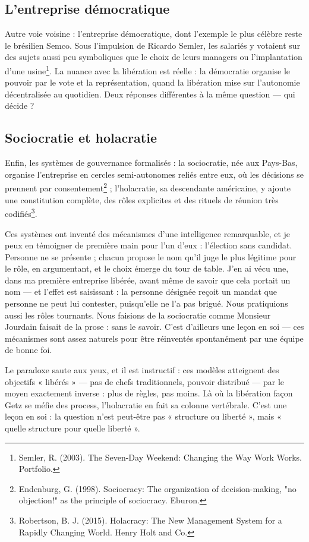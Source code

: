 \subsection{L'entreprise démocratique}

Autre voie voisine : l'entreprise démocratique, dont l'exemple le plus célèbre reste le brésilien Semco. Sous l'impulsion de Ricardo Semler, les salariés y votaient sur des sujets aussi peu symboliques que le choix de leurs managers ou l'implantation d'une usine\footnote{Semler, R. (2003). The Seven-Day Weekend: Changing the Way Work Works. Portfolio.}. La nuance avec la libération est réelle : la démocratie organise le pouvoir par le vote et la représentation, quand la libération mise sur l'autonomie décentralisée au quotidien. Deux réponses différentes à la même question — qui décide ?

\subsection{Sociocratie et holacratie}

Enfin, les systèmes de gouvernance formalisés : la sociocratie, née aux Pays-Bas, organise l'entreprise en cercles semi-autonomes reliés entre eux, où les décisions se prennent par consentement\footnote{Endenburg, G. (1998). Sociocracy: The organization of decision-making, "no objection!" as the principle of sociocracy. Eburon.} ; l'holacratie, sa descendante américaine, y ajoute une constitution complète, des rôles explicites et des rituels de réunion très codifiés\footnote{Robertson, B. J. (2015). Holacracy: The New Management System for a Rapidly Changing World. Henry Holt and Co.}.

Ces systèmes ont inventé des mécanismes d'une intelligence remarquable, et je peux en témoigner de première main pour l'un d'eux : l'élection sans candidat. Personne ne se présente ; chacun propose le nom qu'il juge le plus légitime pour le rôle, en argumentant, et le choix émerge du tour de table. J'en ai vécu une, dans ma première entreprise libérée, avant même de savoir que cela portait un nom — et l'effet est saisissant : la personne désignée reçoit un mandat que personne ne peut lui contester, puisqu'elle ne l'a pas brigué. Nous pratiquions aussi les rôles tournants. Nous faisions de la sociocratie comme Monsieur Jourdain faisait de la prose : sans le savoir. C'est d'ailleurs une leçon en soi — ces mécanismes sont assez naturels pour être réinventés spontanément par une équipe de bonne foi.

Le paradoxe saute aux yeux, et il est instructif : ces modèles atteignent des objectifs « libérés » — pas de chefs traditionnels, pouvoir distribué — par le moyen exactement inverse : plus de règles, pas moins. Là où la libération façon Getz se méfie des process, l'holacratie en fait sa colonne vertébrale. C'est une leçon en soi : la question n'est peut-être pas « structure ou liberté », mais « quelle structure pour quelle liberté ».

